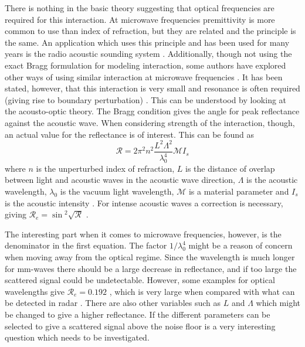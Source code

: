 \documentclass[10pt,a4paper]{eitExjobb}
\begin{document}
	There is nothing in the basic theory suggesting that optical frequencies are required for this interaction. At microwave frequencies premittivity is more common to use than index of refraction, but they are related and the principle is the same. An application which uses this principle and has been used for many years is the radio acoustic sounding system \cite{Buerkle2007}. Additionally, though not using the exact Bragg formulation for modeling interaction, some authors have explored other ways of using similar interaction at microwave frequencies \cite{Lawrence2001}\cite{Merkel2006}. It has been stated, however, that this interaction is very small and resonance is often required (giving rise to boundary perturbation) \cite{Buerkle2007}. This can be understood by looking at the acousto-optic theory. The Bragg condition gives the angle for peak reflectance against the acoustic wave. When considering strength of the interaction, though, an actual value for the reflectance is of interest. This can be found as
	\begin{equation*}
	\mathcal{R} = 2\pi^2n^2 \frac{L^2 \Lambda^2}{\lambda_0^4} \mathcal{M}I_s
	\end{equation*} 
	where $n$ is the unperturbed index of refraction, $L$ is the distance of overlap between light and acoustic waves in the acoustic wave direction, $\Lambda$ is the acoustic wavelength, $\lambda_0$ is the vacuum light wavelength, $\mathcal{M}$ is a material parameter and $I_s$ is the acoustic intensity \cite{Saleh2007}. For intense acoustic waves a correction is necessary, giving $\mathcal{R}_e = \sin{^2\sqrt{\mathcal{R}}}$ \cite{Saleh2007}.
	
	The interesting part when it comes to microwave frequencies, however, is the denominator in the first equation. The factor $1/\lambda_0^4$ might be a reason of concern when moving away from the optical regime. Since the wavelength is much longer for mm-waves there should be a large decrease in reflectance, and if too large the scattered signal could be undetectable. However, some examples for optical wavelengths give $\mathcal{R}_e = 0.192$ \cite{Saleh2007}, which is very large when compared with what can be detected in radar \cite{Richards2012}. There are also other variables such as $L$ and $\Lambda$ which might be changed to give a higher reflectance. If the different parameters can be selected to give a scattered signal above the noise floor is a very interesting question which needs to be investigated.
	
\end{document}
